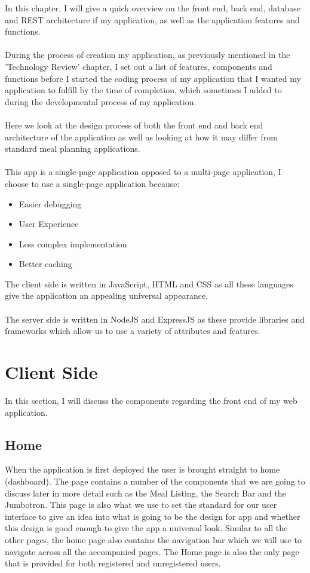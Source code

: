 In this chapter, I will give a quick overview on the front end, back end, database and REST architecture if my application, as well as the application features and functions.\\ \\
During the process of creation my application, as previously mentioned in the 'Technology Review' chapter, I set out a list of features, components and functions before I started the coding process of my application that I wanted my application to fulfill by the time of completion, which sometimes I added to during the developmental process of my application.\\ \\
Here we look at the design process of both the front end and back end architecture of the application as well as looking at how it may differ from standard meal planning applications.\\ \\
This app is a single-page application opposed to a multi-page application, I choose to use a single-page application because:

\begin{itemize}
    \item Easier debugging
    \item User Experience
    \item Less complex implementation
    \item Better caching
\end{itemize}

The client side is written in JavaScript, HTML and CSS as all these languages give the application an appealing universal appearance.\\ \\
The server side is written in NodeJS and ExpressJS as these provide libraries and frameworks which allow us to use a variety of attributes and features.

\section{Client Side}

In this section, I will discuss the components regarding the front end of my web application.

\subsection{Home}

When the application is first deployed the user is brought straight to home (dashboard). The page contains a number of the components that we are going to discuss later in more detail such as the Meal Listing, the Search Bar and the Jumbotron. This page is also what we use to set the standard for our user interface to give an idea into what is going to be the design for app and whether this design is good enough to give the app a universal look. Similar to all the other pages, the home page also contains the navigation bar which we will use to navigate across all the accompanied pages. The Home page is also the only page that is provided for both registered and unregistered users.

